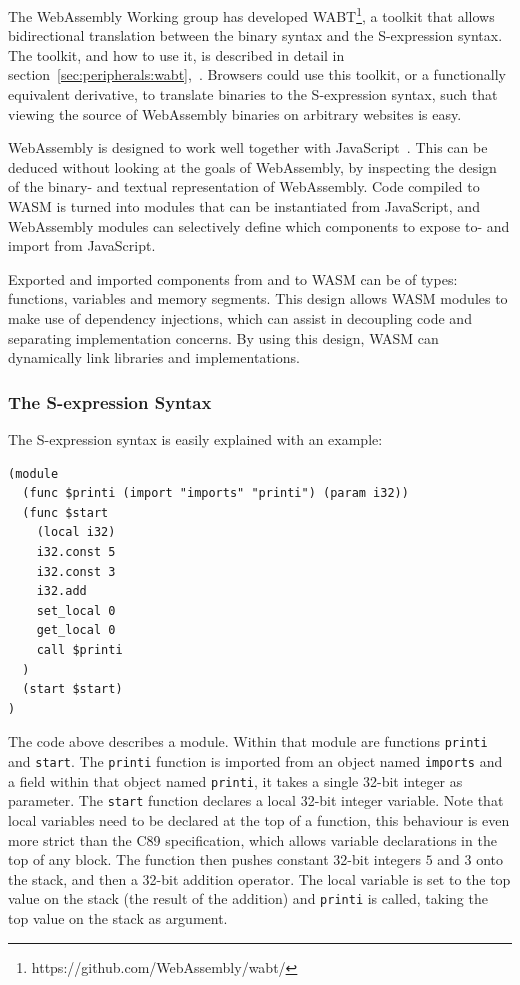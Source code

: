 \documentclass[a4paper]{article}
\begin{document}
The WebAssembly Working group has developed WABT\footnote{https://github.com/WebAssembly/wabt/}, a toolkit that allows bidirectional translation between the binary syntax and the S-expression syntax. The toolkit, and how to use it, is described in detail in section~\ref{sec:peripherals:wabt},~. Browsers could use this toolkit, or a functionally equivalent derivative, to translate binaries to the S-expression syntax, such that viewing the source of WebAssembly binaries on arbitrary websites is easy.

WebAssembly is designed to work well together with JavaScript~\cite{website:wasm-webassembly-high-level-goals}. This can be deduced without looking at the goals of WebAssembly, by inspecting the design of the binary- and textual representation of WebAssembly. Code compiled to WASM is turned into modules that can be instantiated from JavaScript, and WebAssembly modules can selectively define which components to expose to- and import from JavaScript.

Exported and imported components from and to WASM can be of types: functions, variables and memory segments. This design allows WASM modules to make use of dependency injections, which can assist in decoupling code and separating implementation concerns. By using this design, WASM can dynamically link libraries and implementations.

\subsubsection{The S-expression Syntax}
\label{sec:problem-analysis:webassembly:s-exp}
The S-expression syntax is easily explained with an example:
\begin{verbatim}
(module
  (func $printi (import "imports" "printi") (param i32))
  (func $start
    (local i32)
    i32.const 5
    i32.const 3
    i32.add
    set_local 0
    get_local 0
    call $printi
  )
  (start $start)
)
\end{verbatim}
The code above describes a module. Within that module are functions \texttt{printi} and \texttt{start}. The \texttt{printi} function is imported from an object named \texttt{imports} and a field within that object named \texttt{printi}, it takes a single 32-bit integer as parameter. The \texttt{start} function declares a local 32-bit integer variable. Note that local variables need to be declared at the top of a function, this behaviour is even more strict than the C89 specification, which allows variable declarations in the top of any block. The function then pushes constant 32-bit integers $5$ and $3$ onto the stack, and then a 32-bit addition operator. The local variable is set to the top value on the stack (the result of the addition) and \texttt{printi} is called, taking the top value on the stack as argument.
\end{document}
